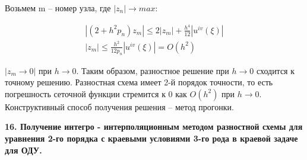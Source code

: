 \documentclass[a4paper,14pt]{article}
\begin{document}
Возьмем m -- номер узла, где $|z_n| \rightarrow max$:

\begin{eqnarray}
	|(2 + h^2 p_n)z_m| \leq 2 |z_m| + \frac{h^4}{12} |u^{iv}(\xi)| \nonumber \\
	|z_m| \leq \frac{h^2}{12 p_n} |u^{iv}(\xi)| = O(h^2)
\end{eqnarray}

$|z_m \rightarrow 0|$ при $h \rightarrow 0$. Таким образом, разностное решение при 
$h \rightarrow 0$ сходится к точному решению. 
Разностная схема имеет 2-й порядок точности, то есть погрешность сеточной функции стремится к 0
как $O(h^2)$ при $h \rightarrow 0$.
Конструктивный способ получения решения -- метод прогонки.

\textbf{16. Получение интегро - интерполяционным методом разностной схемы для уравнения 2-го порядка с краевыми условиями 3-го рода в краевой задаче для ОДУ.}
\end{document}
